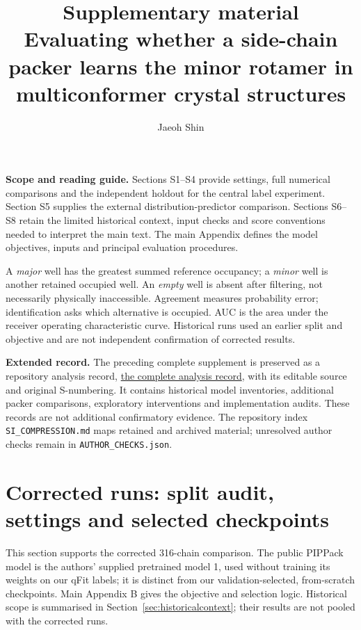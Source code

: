 \documentclass[10pt,a4paper]{article}
\title{\bfseries Supplementary material\\[0.3em]
\large Evaluating whether a side-chain packer learns the minor rotamer in multiconformer crystal structures}
\author{Jaeoh Shin}
\date{}
\begin{document}
\maketitle
\noindent\textbf{Scope and reading guide.} Sections S1--S4 provide settings, full numerical comparisons and the independent holdout for the central label experiment. Section S5 supplies the external distribution-predictor comparison. Sections S6--S8 retain the limited historical context, input checks and score conventions needed to interpret the main text. The main Appendix defines the model objectives, inputs and principal evaluation procedures.

A \emph{major} well has the greatest summed reference occupancy; a \emph{minor} well is another retained occupied well. An \emph{empty} well is absent after filtering, not necessarily physically inaccessible. Agreement measures probability error; identification asks which alternative is occupied. AUC is the area under the receiver operating characteristic curve. Historical runs used an earlier split and objective and are not independent confirmation of corrected results.

\noindent\textbf{Extended record.} The preceding complete supplement is preserved as a repository analysis record, \href{archive/pre_si_compression/si.pdf}{the complete analysis record}, with its editable source and original S-numbering. It contains historical model inventories, additional packer comparisons, exploratory interventions and implementation audits. These records are not additional confirmatory evidence. The repository index \texttt{SI\_COMPRESSION.md} maps retained and archived material; unresolved author checks remain in \texttt{AUTHOR\_CHECKS.json}.

\tableofcontents
\clearpage
\section{Corrected runs: split audit, settings and selected checkpoints}
\label{sec:traindetails}

This section supports the corrected 316-chain comparison. The public PIPPack model is the authors' supplied pretrained model 1, used without training its weights on our qFit labels; it is distinct from our validation-selected, from-scratch checkpoints. Main Appendix B gives the objective and selection logic. Historical scope is summarised in Section~\ref{sec:historicalcontext}; their results are not pooled with the corrected runs.
\end{document}
